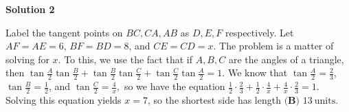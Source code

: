 \begin{enumerate}
\textbf{Solution 2}

Label the tangent points on $BC, CA, AB$ as $D, E, F$ respectively. Let $AF=AE=6$, $BF=BD=8$, and $CE=CD=x.$ The problem is a matter of solving for $x$. To this, we use the fact that if $A,B,C$ are the angles of a triangle, then $\tan{\frac{A}{2}}\tan{\frac{B}{2}}+\tan{\frac{B}{2}}\tan{\frac{C}{2}}+\tan{\frac{C}{2}}\tan{\frac{A}{2}} = 1.$ We know that $\tan{\frac{A}{2}} = \frac{2}{3}$, $\tan{\frac{B}{2}} = \frac{1}{2}$, and $\tan{\frac{C}{2}} = \frac{4}{x},$ so we have the equation $\frac{1}{2}\cdot \frac{2}{3} + \frac{1}{2}\cdot \frac{4}{x} + \frac{4}{x}\cdot \frac{2}{3} = 1.$ Solving this equation yields $x=7$, so the shortest side has length $\boxed{\textbf{(B) \ } 13 \mathrm{\ units}}$.

 


\end{enumerate}